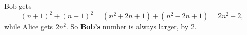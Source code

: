 Bob gets
\[(n+1)^2+(n-1)^2=\left(n^2+2n+1\right)+\left(n^2-2n+1\right)=2n^2+2,\]
while Alice gets $2n^2$. So \textbf{Bob's} number is always larger, by $\boxed{2}$.
